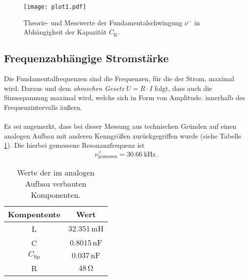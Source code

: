 \begin{figure}[H]
    \centering
    \texttt{[image: plot1.pdf]}
    \caption{Theorie- und Messwerte der Fundamentalschwingung $\nu^-$ in Abhängigkeit
    der Kapazität ${C_\text{K}}$.}
    \label{fig:plot1}
\end{figure}

\subsection{Frequenzabhängige Stromstärke}

Die Fundamentalfrequenzen sind die Frequenzen, für die der Strom, maximal wird. 
Daraus und dem \textit{ohmschen Gesetz} $U = R \cdot I$ folgt, dass auch die Sinusspannung maximal wird,
welche sich in Form von Amplitude. innerhalb des Frequenzintervalls äußern.\\
\\
Es sei angemerkt, dass bei dieser Messung aus technischen Gründen auf einen analogen Aufbau mit anderen Kenngrößen
zurückgegriffen wurde (siehe Tabelle \ref{tab:komponenten_schaltung2}). Die hierbei gemessene Resonanzfrequenz ist 
\begin{equation*}
    \nu^+_{\text{gemessen}} = \qty{30.66}{\kilo\hertz} \, .
\end{equation*}

\begin{table}
    \centering
    \caption{Werte der im analogen Aufbau verbauten Komponenten.}
    \label{tab:komponenten_schaltung2}
    \begin{tabular}{c c}
        \toprule
        Kompentente &  Wert \\
        \midrule
        L               & $32.351 \, \unit{\milli\henry}$   \\
        C               & $0.8015 \, \unit{\nano\farad}$    \\
        $C_{\text{Sp}}$ & $ 0.037 \, \unit{\nano\farad}$    \\
        R               & $ 48 \, \unit{\ohm}$              \\
        \bottomrule
    \end{tabular}
\end{table}

